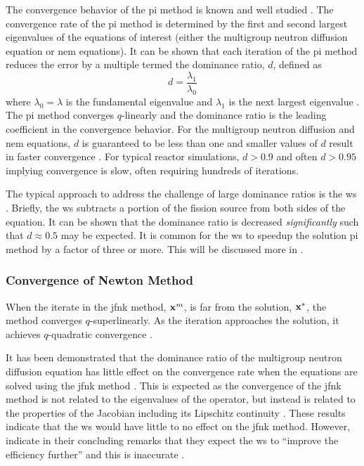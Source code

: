       The convergence behavior of the \gls{pi} method is known and well studied 
      \cite{nakamura,gehinThesis,my_ms_thesis}. The convergence rate of the
      \gls{pi} method is determined by the first and second largest eigenvalues
      of the equations of interest (either the multigroup neutron diffusion
      equation or \gls{nem} equations). It can be shown that each iteration of
      the \gls{pi} method reduces the error by a multiple termed the dominance
      ratio, $d$, defined as
      \begin{equation}
        \label{eq:dominance_ratio}
        d = \frac{\lambda_1}{\lambda_0}
      \end{equation}
      where $\lambda_0 = \lambda$ is the fundamental eigenvalue and $\lambda_1$
      is the next largest eigenvalue \cite{my_ms_thesis}. The \gls{pi} method
      converges $q$-linearly and the dominance ratio is the leading coefficient
      in the convergence behavior. For the multigroup neutron diffusion and
      \gls{nem} equations, $d$ is guaranteed to be less than one and smaller
      values of $d$ result in faster convergence \cite{nakamura}. For typical
      reactor simulations, $d > 0.9$ and often $d > 0.95$ implying convergence
      is slow, often requiring hundreds of iterations.

      The typical approach to address the challenge of large dominance ratios is
      the \gls{ws} \cite{gehinThesis}. Briefly, the \gls{ws} subtracts a portion
      of the fission source from both sides of the equation. It can be shown
      that the dominance ratio is decreased \textit{significantly} such that $d
      \approx 0.5$ may be expected. It is common for the \gls{ws} to speedup 
      the solution \gls{pi} method by a factor of three or more. This will be
      discussed more in .

    \subsubsection{Convergence of Newton Method}

      When the iterate in the \gls{jfnk} method, $\mathbf{x}^m$, is far from the
      solution, $\mathbf{x}^*$, the method converges $q$-superlinearly. As the
      iteration approaches the solution, it achieves $q$-quadratic convergence
      \cite{textbookkelley}.

      It has been demonstrated that the dominance ratio of the multigroup
      neutron diffusion equation has little effect on the convergence rate when
      the equations are solved using the \gls{jfnk} method \cite{gill_azmy}.
      This is expected as the convergence of the \gls{jfnk} method is not
      related to the eigenvalues of the operator, but instead is related to the
      properties of the Jacobian including its Lipschitz continuity
      \cite{textbookkelley}. These results indicate that the \gls{ws} would have
      little to no effect on the \gls{jfnk} method. However,
      \citeauthor{qe2paper} indicate in their concluding remarks that they
      expect the \gls{ws} to ``improve the efficiency further'' and this is
      inaccurate \cite{qe2paper}.
      
